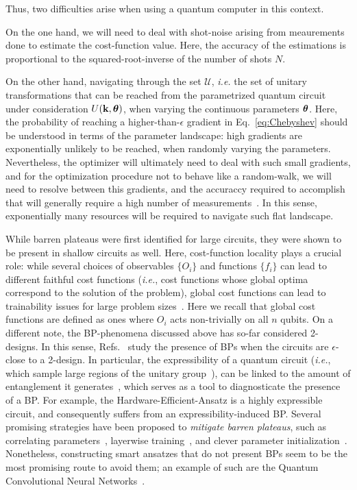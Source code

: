 Thus, two difficulties arise when using a quantum computer in this context.

On the one hand, we will need to deal with shot-noise arising from meaurements done to estimate the cost-function value. Here, the accuracy of the estimations is proportional to the squared-root-inverse of the number of shots $N$.

On the other hand, navigating through the set $\mathcal{U}$, \textit{i.e.} the set of unitary transformations that can be reached from the parametrized quantum circuit under consideration $U(\mathbf{k},\bm{\theta})$, when varying the continuous parameters $\bm{\theta}$. Here, the probability of reaching a higher-than-$\epsilon$ gradient in Eq.~\ref{eq:Chebyshev} should be understood in terms of the parameter landscape: high gradients are exponentially unlikely to be reached, when randomly varying the parameters. Nevertheless, the optimizer will ultimately need to deal with such small gradients, and for the optimization procedure not to behave like a random-walk, we will need to resolve between this gradients, and the accuraccy required to accomplish that will generally require a high number of measurements~\cite{mcclean2018barren}. In this sense, exponentially many resources will be required to navigate such flat landscape.


While barren plateaus were first identified for large circuits, they were shown to be present in shallow circuits as well. Here, cost-function locality plays a crucial role: while several choices of observables $\{O_i\}$ and functions $\{f_i\}$ can lead to different faithful cost functions (\textit{i.e.}, cost functions whose global optima correspond to the solution of the problem), global cost functions can lead to trainability issues for large problem sizes~\cite{cerezo2020cost,sharma2020trainability}. Here we recall that global cost functions are defined as ones where $O_i$ acts non-trivially on all $n$ qubits. On a different note, the BP-phenomena discussed above has so-far considered 2-designs. In this sense, Refs.~\cite{holmes2021connecting,larocca2021diagnosing} study the presence of BPs when the circuits are $\epsilon$-close to a 2-design. In particular, the expressibility of a quantum circuit (\textit{i.e.}, which sample large regions of the unitary group~\cite{sukin2019expressibility}), can be linked to the amount of entanglement it generates~\cite{sharma2020trainability,patti2020entanglement,marrero2020entanglement}, which serves as a tool to diagnosticate the presence of a BP. For example, the Hardware-Efficient-Ansatz is a highly expressible circuit, and consequently suffers from an expressibility-induced BP. Several promising strategies have been proposed to \textit{mitigate barren plateaus}, such as correlating parameters~\cite{volkoff2021large}, layerwise training~\cite{skolik2020layerwise}, and clever parameter initialization~\cite{grant2019initialization,verdon2019learning}. Nonetheless, constructing smart ansatzes that do not present BPs seem to be the most promising route to avoid them; an example of such are the Quantum Convolutional Neural Networks~\cite{Cong2019,pesah2020absence}.

